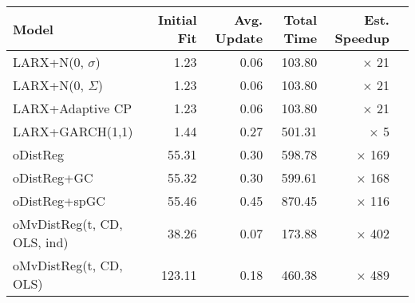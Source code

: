\begin{tabular}{lrrrrr}
\toprule
Model & Initial Fit & Avg. Update & Total Time & Est. Speedup \\
\midrule
LARX+N(0, $\sigma$) & {\cellcolor[HTML]{F7FBFF}} \color[HTML]{000000} 1.23 & {\cellcolor[HTML]{E2EDF8}} \color[HTML]{000000} 0.06 & {\cellcolor[HTML]{EEF5FC}} \color[HTML]{000000} 103.80 & {\cellcolor[HTML]{BDD7EC}} \color[HTML]{000000} $\times$ 21 \\
LARX+N(0, $\Sigma$) & {\cellcolor[HTML]{F7FBFF}} \color[HTML]{000000} 1.23 & {\cellcolor[HTML]{E2EDF8}} \color[HTML]{000000} 0.06 & {\cellcolor[HTML]{EEF5FC}} \color[HTML]{000000} 103.80 & {\cellcolor[HTML]{BDD7EC}} \color[HTML]{000000} $\times$ 21 \\
LARX+Adaptive CP & {\cellcolor[HTML]{F7FBFF}} \color[HTML]{000000} 1.23 & {\cellcolor[HTML]{E2EDF8}} \color[HTML]{000000} 0.06 & {\cellcolor[HTML]{EEF5FC}} \color[HTML]{000000} 103.80 & {\cellcolor[HTML]{BDD7EC}} \color[HTML]{000000} $\times$ 21 \\
LARX+GARCH(1,1) & {\cellcolor[HTML]{F4F9FE}} \color[HTML]{000000} 1.44 & {\cellcolor[HTML]{82BBDB}} \color[HTML]{000000} 0.27 & {\cellcolor[HTML]{A4CCE3}} \color[HTML]{000000} 501.31 & {\cellcolor[HTML]{F7FBFF}} \color[HTML]{000000} $\times$ 5 \\
oDistReg & {\cellcolor[HTML]{7FB9DA}} \color[HTML]{000000} 55.31 & {\cellcolor[HTML]{7AB6D9}} \color[HTML]{000000} 0.30 & {\cellcolor[HTML]{97C6DF}} \color[HTML]{000000} 598.78 & {\cellcolor[HTML]{3181BD}} \color[HTML]{F1F1F1} $\times$ 169 \\
oDistReg+GC & {\cellcolor[HTML]{7FB9DA}} \color[HTML]{000000} 55.32 & {\cellcolor[HTML]{7AB6D9}} \color[HTML]{000000} 0.30 & {\cellcolor[HTML]{97C6DF}} \color[HTML]{000000} 599.61 & {\cellcolor[HTML]{3181BD}} \color[HTML]{F1F1F1} $\times$ 168 \\
oDistReg+spGC & {\cellcolor[HTML]{7FB9DA}} \color[HTML]{000000} 55.46 & {\cellcolor[HTML]{5BA3D0}} \color[HTML]{F1F1F1} 0.45 & {\cellcolor[HTML]{79B5D9}} \color[HTML]{000000} 870.45 & {\cellcolor[HTML]{4594C7}} \color[HTML]{F1F1F1} $\times$ 116 \\
oMvDistReg(t, CD, OLS, ind) & {\cellcolor[HTML]{91C3DE}} \color[HTML]{000000} 38.26 & {\cellcolor[HTML]{D6E6F4}} \color[HTML]{000000} 0.07 & {\cellcolor[HTML]{DAE8F6}} \color[HTML]{000000} 173.88 & {\cellcolor[HTML]{0B559F}} \color[HTML]{F1F1F1} $\times$ 402 \\
oMvDistReg(t, CD, OLS) & {\cellcolor[HTML]{5CA4D0}} \color[HTML]{F1F1F1} 123.11 & {\cellcolor[HTML]{A3CCE3}} \color[HTML]{000000} 0.18 & {\cellcolor[HTML]{A9CFE5}} \color[HTML]{000000} 460.38 & {\cellcolor[HTML]{084B93}} \color[HTML]{F1F1F1} $\times$ 489 \\

\end{tabular}
